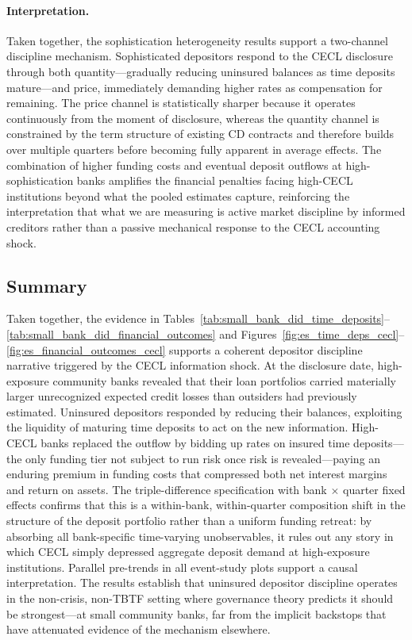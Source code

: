 \paragraph{Interpretation.}
Taken together, the sophistication heterogeneity results support a two-channel
discipline mechanism.  Sophisticated depositors respond to the CECL disclosure
through both quantity---gradually reducing uninsured balances as time deposits
mature---and price, immediately demanding higher rates as compensation for
remaining.  The price channel is statistically sharper because it operates
continuously from the moment of disclosure, whereas the quantity channel is
constrained by the term structure of existing CD contracts and therefore builds
over multiple quarters before becoming fully apparent in average effects.  The
combination of higher funding costs and eventual deposit outflows at
high-sophistication banks amplifies the financial penalties facing high-CECL
institutions beyond what the pooled estimates capture, reinforcing the
interpretation that what we are measuring is active market discipline by informed
creditors rather than a passive mechanical response to the CECL accounting shock.

\subsection{Summary}
\label{sec:results:summary}

Taken together, the evidence in
Tables~\ref{tab:small_bank_did_time_deposits}--\ref{tab:small_bank_did_financial_outcomes}
and Figures~\ref{fig:es_time_deps_cecl}--\ref{fig:es_financial_outcomes_cecl}
supports a coherent depositor discipline narrative triggered by the CECL
information shock.  At the disclosure date, high-exposure community banks revealed
that their loan portfolios carried materially larger unrecognized expected credit
losses than outsiders had previously estimated.  Uninsured depositors responded
by reducing their balances, exploiting the liquidity of maturing time deposits to
act on the new information.  High-CECL banks replaced the outflow by bidding up
rates on insured time deposits---the only funding tier not subject to run risk
once risk is revealed---paying an enduring premium in funding costs that
compressed both net interest margins and return on assets.  The triple-difference
specification with bank $\times$ quarter fixed effects confirms that this is a
within-bank, within-quarter composition shift in the structure of the deposit
portfolio rather than a uniform funding retreat: by absorbing all bank-specific
time-varying unobservables, it rules out any story in which CECL simply depressed
aggregate deposit demand at high-exposure institutions.  Parallel pre-trends in
all event-study plots support a causal interpretation.  The results establish that
uninsured depositor discipline operates in the non-crisis, non-TBTF setting where
governance theory predicts it should be strongest---at small community banks, far
from the implicit backstops that have attenuated evidence of the mechanism
elsewhere.
